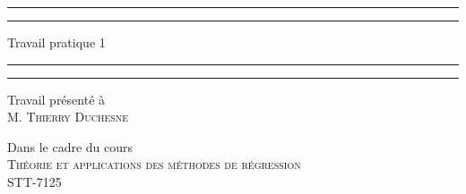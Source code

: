 \documentclass{article}
\begin{document}
	\renewcommand{\tablename}{Tableau}
	\renewcommand{\figurename}{Illustration}
	
	\begin{titlepage}
		\centering %
		
		\scshape %
		
		\vspace*{7\baselineskip} %
		
		
		\rule{\textwidth}{1.6pt}\vspace*{-\baselineskip}\vspace*{2pt} %
		\rule{\textwidth}{0.4pt} %
		
		\vspace{0.75\baselineskip} %
		{\LARGE Travail pratique 1\\} %
		\vspace{0.75\baselineskip} %
		
		\rule{\textwidth}{0.4pt}\vspace*{-\baselineskip}\vspace{3.2pt} %
		\rule{\textwidth}{1.6pt} %
		
		\vspace{4\baselineskip} %
		
		
		Travail présenté à \\
		{\scshape\Large M. Thierry Duchesne\\}
		
		\vspace*{4\baselineskip}
		
		Dans le cadre du cours\\
		{\scshape\Large Théorie et applications des méthodes de régression \\ STT-7125}
		
		
		\vspace*{4\baselineskip} %
		

\end{titlepage}
\end{document}
